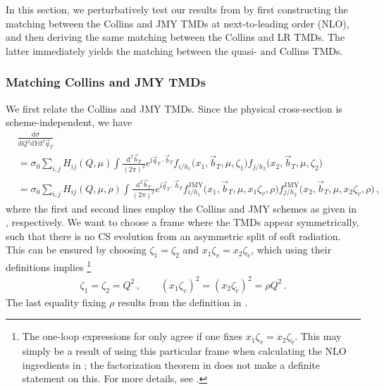 \documentclass[11pt,a4paper]{article}
\newcommand{\df}{\mathrm{d}}
\newcommand{\img}{\mathrm{i}}
\newcommand{\nn}{\nonumber}
\newcommand{\bt}{\vec b_T}
\newcommand{\qt}{\vec q_T}
\newcommand{\tv}{{\tilde v}}
\newcommand{\JMY}{\mathrm{JMY}}
\begin{document}
In this section, we perturbatively test our results from 
by first constructing the matching between the Collins and JMY TMDs at next-to-leading order (NLO),
and then deriving the same matching between the Collins and LR TMDs.
The latter immediately yields the matching between the quasi- and Collins TMDs.

\subsubsection{Matching Collins and JMY TMDs}
\label{app:Collins_JMY_matching}

We first relate the Collins and JMY TMDs.
Since the physical cross-section is scheme-independent, we have
\begin{align} \label{eq:fact_thm_cmp}
 &\frac{\df\sigma}{\df Q^2 \df Y \df^2\qt}
 \\\nn&
 = \sigma_0 \sum_{i,j} H_{ij}(Q, \mu)
   \int\frac{\df^2\bt}{(2\pi)^2} e^{\img \qt \cdot \bt}
   f_{i/h_1}\bigl(x_1, \bt, \mu, \zeta_1\bigr) f_{j/h_2}\bigl(x_2, \bt, \mu, \zeta_2 \bigr)
 \\\nn&
 = \sigma_0 \sum_{i,j} H_{ij}(Q, \mu, \rho)
   \int\frac{\df^2\bt}{(2\pi)^2} e^{\img \qt \cdot \bt}
   f^\JMY_{i/h_1}\bigl(x_1, \bt, \mu, x_1 \zeta_v, \rho\bigr) f^\JMY_{j/h_2}\bigl(x_2, \bt, \mu, x_2 \zeta_\tv, \rho\bigr)
\,,\end{align}
where the first and second lines employ the Collins and JMY schemes
as given in , respectively.
We want to choose a frame where the TMDs appear symmetrically,
such that there is no CS evolution from an asymmetric split of soft radiation.
This can be ensured by choosing $\zeta_1 = \zeta_2$ and $x_1 \zeta_v = x_2 \zeta_\tv$,
which using their definitions implies%
\footnote{
	The one-loop expressions for 
		only agree if one fixes $x_1 \zeta_v = x_2 \zeta_\tv$.
		This may simply be a result of using this particular frame when
		calculating the NLO ingredients in ; 
		the factorization theorem in  does not make
		a definite statement on this. For more details, see .
}
\begin{align} \label{eq:symmetric_condition}
   \zeta_1 = \zeta_2 = Q^2
 \,,\qquad
   (x_1 \zeta_v)^2 = (x_2 \zeta_\tv)^2 = \rho  Q^2
\,.\end{align}
The last equality fixing $\rho$ results from the definition in .
\end{document}
